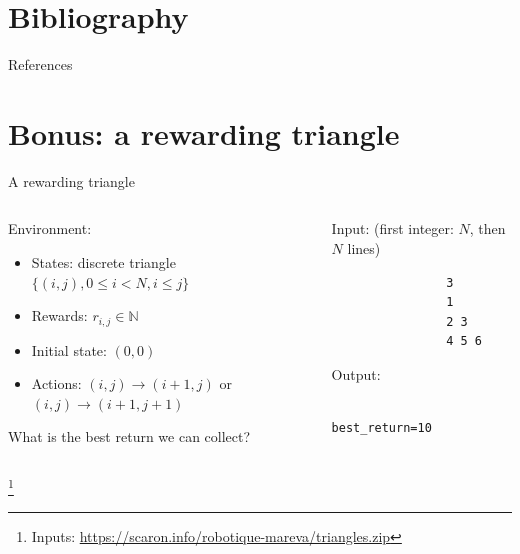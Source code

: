 \documentclass[11pt, aspectratio=169]{beamer}
\newcommand\blfootnote[1]{%
  \begingroup
  \renewcommand\thefootnote{}%
  \footnote{#1}%
  \addtocounter{footnote}{-1}%
  \endgroup
}
\begin{document}
\section*{Bibliography}

\renewcommand*{\bibfont}{\footnotesize}
\begin{frame}[allowframebreaks]{References}
    \printbibliography[heading=none]
\end{frame}

\section*{Bonus: a rewarding triangle}

\begin{frame}[fragile]{A rewarding triangle}
    \begin{columns}
        \begin{column}{0.50\columnwidth}
            Environment:
            \begin{itemize}
                \item States: discrete triangle $\{(i, j), 0 \leq i < N, i \leq j \}$
                \item Rewards: $r_{i, j} \in \mathbb{N}$
                \item Initial state: $(0, 0)$
                \item Actions: $(i, j) \to (i + 1, j)$ or $(i, j) \to (i + 1, j + 1)$
            \end{itemize}
            What is the best return we can collect?
        \end{column}
        \begin{column}{0.50\columnwidth}
            Input: (first integer: $N$, then $N$ lines)
            \begin{verbatim}
                3
                1
                2 3
                4 5 6
            \end{verbatim}
            Output:
            \begin{verbatim}
                best_return=10
            \end{verbatim}
        \end{column}
    \end{columns}
    \blfootnote{
        Inputs: \url{https://scaron.info/robotique-mareva/triangles.zip}
    }
\end{frame}
\end{document}
